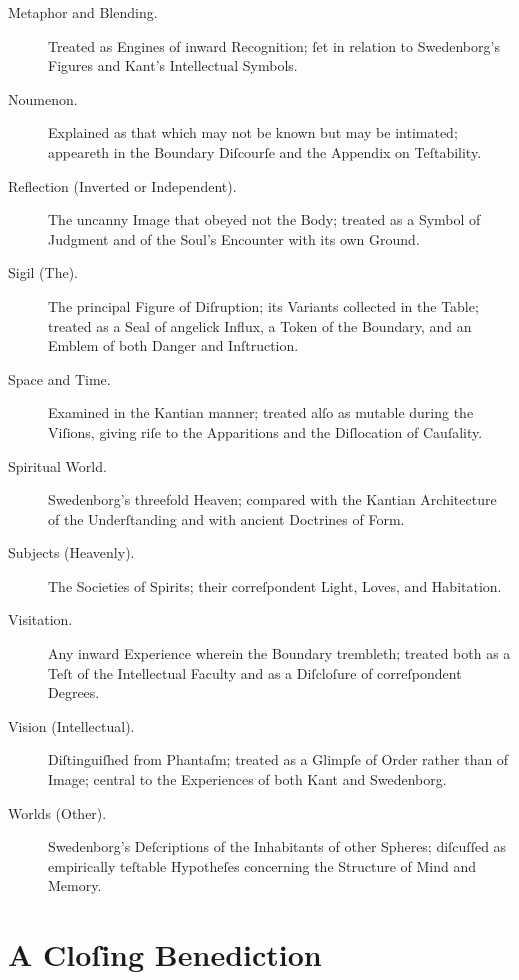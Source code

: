 \documentclass[12pt]{article}
\begin{document}
\begin{description}
\item[Metaphor and Blending.]  
Treated as Engines of inward Recognition; ſet in relation to 
Swedenborg’s Figures and Kant’s Intellectual Symbols.

\item[Noumenon.]  
Explained as that which may not be known but may be intimated; 
appeareth in the Boundary Diſcourſe and the Appendix on Teſtability.

\item[Reflection (Inverted or Independent).]  
The uncanny Image that obeyed not the Body; treated as a Symbol of 
Judgment and of the Soul’s Encounter with its own Ground.

\item[Sigil (The).]  
The principal Figure of Diſruption; its Variants collected in the 
Table; treated as a Seal of angelick Influx, a Token of the 
Boundary, and an Emblem of both Danger and Inſtruction.

\item[Space and Time.]  
Examined in the Kantian manner; treated alſo as mutable during the 
Viſions, giving riſe to the Apparitions and the Diſlocation of 
Cauſality.

\item[Spiritual World.]  
Swedenborg’s threefold Heaven; compared with the Kantian Architecture 
of the Underſtanding and with ancient Doctrines of Form.

\item[Subjects (Heavenly).]  
The Societies of Spirits; their correſpondent Light, Loves, and 
Habitation.

\item[Visitation.]  
Any inward Experience wherein the Boundary trembleth; treated both 
as a Teſt of the Intellectual Faculty and as a Diſcloſure of 
correſpondent Degrees.

\item[Vision (Intellectual).]  
Diſtinguiſhed from Phantaſm; treated as a Glimpſe of Order rather 
than of Image; central to the Experiences of both Kant and 
Swedenborg.

\item[Worlds (Other).]  
Swedenborg’s Deſcriptions of the Inhabitants of other Spheres; 
diſcuſſed as empirically teſtable Hypotheſes concerning the 
Structure of Mind and Memory.

\end{description}

\newpage

\section*{A Cloſing Benediction}
\end{document}
